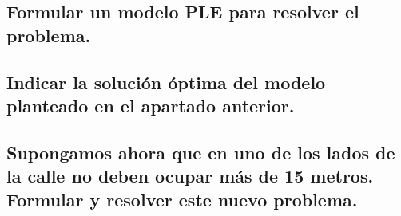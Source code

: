 \documentclass[10pt, a4paper]{article}
\begin{document}
		\subsection{Formular un modelo PLE para resolver el problema.}

			\paragraph{}

		\subsection{Indicar la solución óptima del modelo planteado en el apartado anterior.}

			\paragraph{}

		\subsection{Supongamos ahora que en uno de los lados de la calle no deben ocupar más de 15 metros. Formular y resolver este nuevo problema.}

			\paragraph{}
\end{document}
